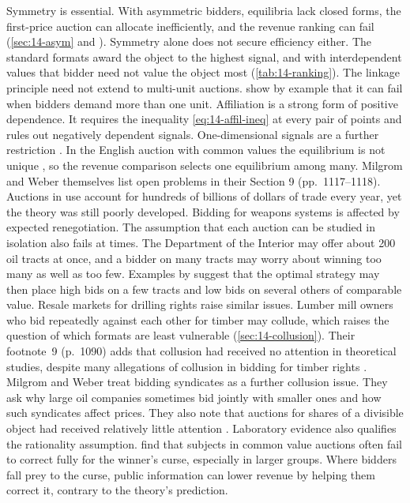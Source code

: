  Symmetry is essential. With asymmetric bidders, equilibria lack closed
forms, the first-price auction can allocate inefficiently, and the revenue ranking can fail
(\cref{sec:14-asym} and \citealp{MaskinRiley2000}). Symmetry alone does not secure efficiency either. The
standard formats award the object to the highest signal, and with interdependent values that bidder need
not value the object most (\cref{tab:14-ranking}). The linkage principle need not extend to multi-unit auctions.
\citet{PerryReny1999} show by example that it can fail when bidders demand more than one unit.
Affiliation is a strong form of positive dependence. It requires the inequality \eqref{eq:14-affil-ineq} at
every pair of points and rules out negatively dependent signals. One-dimensional signals are a further
restriction \citep[footnote~14]{MilgromWeber1982}. In the English auction with common values the equilibrium
is not unique \citep{BikhchandaniHaileRiley2002}, so the revenue comparison selects one equilibrium among many.
Milgrom and Weber themselves list open problems in their Section 9 (pp.~1117--1118). Auctions in use account
for hundreds of billions of dollars of trade every year, yet the theory was still poorly developed. Bidding for
weapons systems is affected by expected renegotiation. The assumption that each auction can be studied in
isolation also fails at times. The Department of the Interior may offer about 200 oil tracts at once, and a
bidder on many tracts may worry about winning too many as well as too few. Examples by
\citet{EngelbrechtWiggansWeber1979} suggest that the optimal strategy may then place high bids on a few tracts
and low bids on several others of comparable value. Resale markets for drilling rights raise similar issues.
Lumber mill owners who bid repeatedly against each other for timber may collude, which raises the question of
which formats are least vulnerable (\cref{sec:14-collusion}). Their footnote~9 (p.~1090) adds that collusion had
received no attention in theoretical studies, despite many allegations of collusion in bidding for timber
rights \citep{Mead1967}. Milgrom and Weber treat bidding syndicates as a further collusion issue. They
ask why large oil companies sometimes bid jointly with smaller ones and how such syndicates affect prices. They also note that auctions for shares of a
divisible object had received relatively little attention \citep[p.~1118]{MilgromWeber1982}. Laboratory
evidence also qualifies the
rationality assumption. \citet{KagelLevin1986} find that subjects in common value auctions often fail to
correct fully for the winner's curse, especially in larger groups. Where bidders fall prey to the curse,
public information can lower revenue by helping them correct it, contrary to the theory's prediction.

